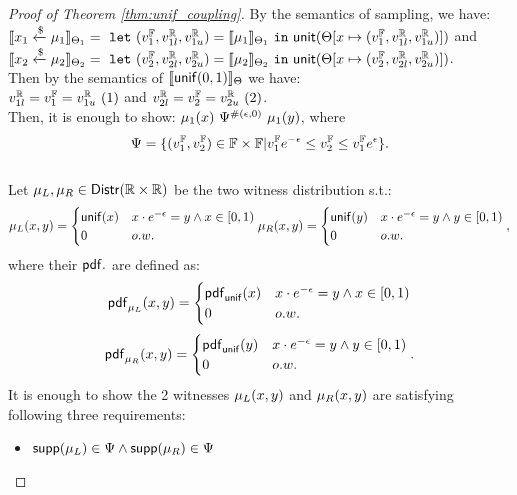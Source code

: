\documentclass[a4paper,11pt]{article}
\begin{document}
\begin{proof}[Proof of Theorem \ref{thm:unif_coupling}]
	By the semantics of sampling, we have:\\
	$\llbracket x_1 \xleftarrow{\$} \mu_1 \rrbracket_{\Theta_1} = 
	~\mathtt{let}~ (v^{\mathbb{F}}_1, v^{\mathbb{R}}_{1l}, v^{\mathbb{R}}_{1u}) 
	= \llbracket \mu_1 \rrbracket_{\Theta_1} 
	~\mathtt{in}~ 
	\mathsf{unit}(\Theta[x \mapsto (v^{\mathbb{F}}_1, v^{\mathbb{R}}_{1l}, v^{\mathbb{R}}_{1u})])
	$ and 
	\\
	$\llbracket x_2 \xleftarrow{\$} \mu_2 \rrbracket_{\Theta_2} = 
	~\mathtt{let}~ (v^{\mathbb{F}}_2, v^{\mathbb{R}}_{2l}, v^{\mathbb{R}}_{2u}) 
	= \llbracket \mu_2 \rrbracket_{\Theta_2} 
	~\mathtt{in}~ 
	\mathsf{unit}(\Theta[x \mapsto (v^{\mathbb{F}}_2, v^{\mathbb{R}}_{2l}, v^{\mathbb{R}}_{2u})])
	$. \\
	Then by the semantics of $\llbracket \mathsf{unif}(0, 1) \rrbracket_{\Theta}$ we have:
	\\
	$ v^{\mathbb{R}}_{1l} = v^{\mathbb{F}}_1 = v^{\mathbb{R}}_{1u} ~ (1)$ 
	and
	$ v^{\mathbb{R}}_{2l} = v^{\mathbb{F}}_2 = v^{\mathbb{R}}_{2u} ~ (2)$.
	\\
	Then, it is enough to show:
	${\mu_1}(x) ~ \Psi^{\#(\epsilon, 0)} ~ {\mu_1}(y)$, where
	\[
		\Psi = \{(v^{\mathbb{F}}_1, v^{\mathbb{F}}_2) \in \mathbb{F} \times \mathbb{F}
		| 
		v^{\mathbb{F}}_1 e^{-\epsilon} 
		\leq v^{\mathbb{F}}_2
		\leq v^{\mathbb{F}}_1 e^{\epsilon} \}.
	\]
%
\\
%
Let $\mu_L, \mu_R \in \mathsf{Distr}(\mathbb{R} \times \mathbb{R})$ be the two witness distribution s.t.:
\[
	{\mu_L}(x, y) = 
	\begin{cases}
	{\mathsf{unif}}(x) & x \cdot e^{-\epsilon} = y \land x \in [0, 1)\\
	0       & o.w.
	\end{cases}
	\\
	{\mu_R}(x, y) = 
	\begin{cases}
	{\mathsf{unif}}(y) & x \cdot e^{-\epsilon} = y \land y \in [0, 1)\\
	0       & o.w.
	\end{cases},
\]
%
%
where their $\mathsf{pdf}.$ are defined as:
\[
	\mathsf{pdf}_{\mu_L}(x, y) = 
	\begin{cases}
	\mathsf{pdf}_{\mathsf{unif}}(x) & x \cdot e^{-\epsilon} = y \land x \in [0, 1)\\
	0       & o.w.
	\end{cases}
\]
%
\[
	\mathsf{pdf}_{\mu_R}(x, y) = 
	\begin{cases}
	\mathsf{pdf}_{\mathsf{unif}}(y) & x \cdot e^{-\epsilon} = y \land y \in [0, 1)\\
	0       & o.w.
	\end{cases}.
\]
It is enough to show the 2 witnesses $\mu_L(x, y)$ and $\mu_R(x, y)$ are satisfying following three requirements:
\begin{itemize}
	\item $\mathsf{supp}(\mu_L) \in \Psi \land \mathsf{supp}(\mu_R) \in \Psi$


\end{itemize}
\end{proof}
\end{document}
